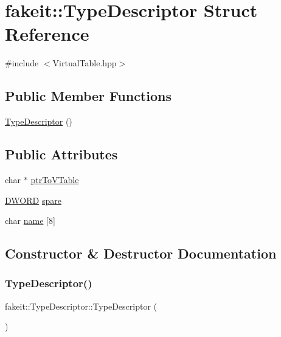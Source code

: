 \hypertarget{structfakeit_1_1TypeDescriptor}{}\section{fakeit\+::Type\+Descriptor Struct Reference}
\label{structfakeit_1_1TypeDescriptor}


{\ttfamily \#include $<$Virtual\+Table.\+hpp$>$}

\subsection*{Public Member Functions}
\begin{DoxyCompactItemize}
\item 
\mbox{\hyperlink{structfakeit_1_1TypeDescriptor_a3bc069ce0899a9d15eb7a0849efb067d}{Type\+Descriptor}} ()
\end{DoxyCompactItemize}
\subsection*{Public Attributes}
\begin{DoxyCompactItemize}
\item 
char $\ast$ \mbox{\hyperlink{structfakeit_1_1TypeDescriptor_a06d363f2d70e40100beff0c23aa49443}{ptr\+To\+V\+Table}}
\item 
\mbox{\hyperlink{namespacefakeit_a3d9fcff73186d3a22472ec6156db1f10}{D\+W\+O\+RD}} \mbox{\hyperlink{structfakeit_1_1TypeDescriptor_abb3213f6224021d1027eea1e073012e7}{spare}}
\item 
char \mbox{\hyperlink{structfakeit_1_1TypeDescriptor_a8f75f4fe227fc84b70edf2bd5f08e757}{name}} \mbox{[}8\mbox{]}
\end{DoxyCompactItemize}


\subsection{Constructor \& Destructor Documentation}
\mbox{\label{structfakeit_1_1TypeDescriptor_a3bc069ce0899a9d15eb7a0849efb067d}} 
\subsubsection{\texorpdfstring{TypeDescriptor()}{TypeDescriptor()}}
{\footnotesize\ttfamily fakeit\+::\+Type\+Descriptor\+::\+Type\+Descriptor (\begin{DoxyParamCaption}{ }\end{DoxyParamCaption})\hspace{0.3cm}{\ttfamily [inline]}}



